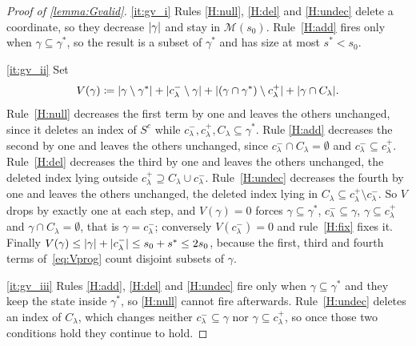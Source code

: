 \begin{proof}[Proof of \cref{lemma:Gvalid}]
    \ref{it:gv_i} Rules \ref{H:null}, \ref{H:del} and \ref{H:undec}
    delete a coordinate, so they decrease $\lvert\gamma\rvert$ and stay in
    $\mathscr{M}(s_0)$. Rule~\ref{H:add} fires only when
    $\gamma\subseteq\gamma^{\ast}$, so the result is a subset of
    $\gamma^{\ast}$ and has size at most $s^{\ast}<s_0$.

    \ref{it:gv_ii} Set
    \begin{equation}
        \label{eq:Vprog}
        V(\gamma)\coloneq\lvert\gamma\setminus\gamma^{\ast}\rvert
        +\lvert c^{-}_\lambda\setminus\gamma\rvert
        +\lvert(\gamma\cap\gamma^{\ast})\setminus c^{+}_\lambda\rvert
        +\lvert\gamma\cap C_\lambda\rvert .
    \end{equation}
    Rule~\ref{H:null} decreases the first term by one and leaves the
    others unchanged, since it deletes an index of $S^{c}$ while
    $c^{-}_\lambda,c^{+}_\lambda,C_\lambda\subseteq\gamma^{\ast}$. Rule
    \ref{H:add} decreases the second by one and leaves the others
    unchanged, since $c^{-}_\lambda\cap C_\lambda=\emptyset$ and
    $c^{-}_\lambda\subseteq c^{+}_\lambda$. Rule~\ref{H:del} decreases
    the third by one and leaves the others unchanged, the deleted index
    lying outside $c^{+}_\lambda\supseteq C_\lambda\cup c^{-}_\lambda$.
    Rule~\ref{H:undec} decreases the fourth by one and leaves the others
    unchanged, the deleted index lying in
    $C_\lambda\subseteq c^{+}_\lambda\setminus c^{-}_\lambda$. So $V$
    drops by exactly one at each step, and $V(\gamma)=0$ forces
    $\gamma\subseteq\gamma^{\ast}$, $c^{-}_\lambda\subseteq\gamma$,
    $\gamma\subseteq c^{+}_\lambda$ and $\gamma\cap C_\lambda=\emptyset$,
    that is $\gamma=c^{-}_\lambda$; conversely
    $V(c^{-}_\lambda)=0$ and rule~\ref{H:fix} fixes it. Finally
    $V(\gamma)\leq\lvert\gamma\rvert+\lvert c^{-}_\lambda\rvert\leq s_0+s^{\ast}
    \leq2s_0$, because the first, third and fourth terms
    of~\eqref{eq:Vprog} count disjoint subsets of $\gamma$.

    \ref{it:gv_iii} Rules \ref{H:add}, \ref{H:del} and \ref{H:undec} fire
    only when $\gamma\subseteq\gamma^{\ast}$ and they keep the state
    inside $\gamma^{\ast}$, so \ref{H:null} cannot fire afterwards.
    Rule~\ref{H:undec} deletes an index of $C_\lambda$, which changes
    neither $c^{-}_\lambda\subseteq\gamma$ nor
    $\gamma\subseteq c^{+}_\lambda$, so once those two conditions hold
    they continue to hold.
\end{proof}

